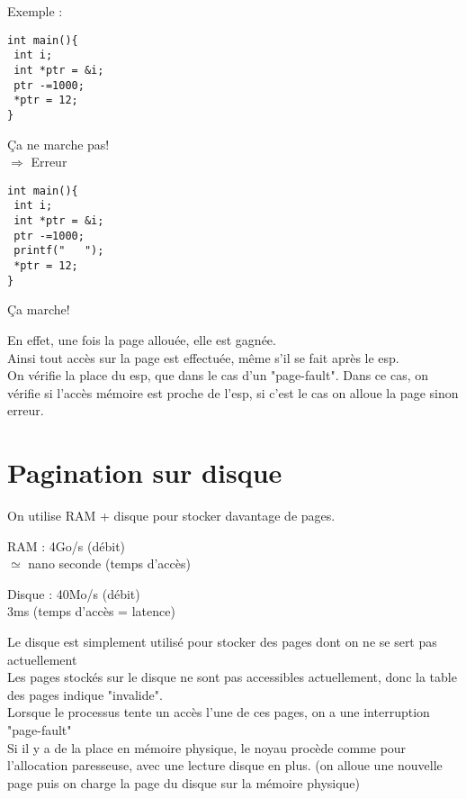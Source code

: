 \documentclass[12pt,a4paper]{report}
\begin{document}
Exemple : \\
\begin{minipage}{0.5\linewidth}
\begin{verbatim}
int main(){
 int i;
 int *ptr = &i;
 ptr -=1000;
 *ptr = 12;
}
\end{verbatim}
Ça ne marche pas!\\
$\Rightarrow$ Erreur
\end{minipage}
\begin{minipage}{0.5\linewidth}
\begin{verbatim}
int main(){
 int i;
 int *ptr = &i;
 ptr -=1000;
 printf("   ");
 *ptr = 12;
}
\end{verbatim}
Ça marche!
\end{minipage}

\bigskip
En effet, une fois la page allouée, elle est gagnée.\\
Ainsi tout accès sur la page est effectuée, même s'il se fait après le esp.\\ On vérifie la place du esp, que dans le cas d'un "page-fault". Dans ce cas, on vérifie si l’accès mémoire est proche de l'esp, si c'est le cas on alloue la page sinon erreur.\\

\chapter{Pagination sur disque}
On utilise RAM + disque pour stocker davantage de pages.\\

\begin{minipage}{0.5\linewidth}
RAM : 4Go/s (débit) \\
\hspace{2cm}$\simeq$ nano seconde (temps d'accès)\\
\end{minipage}
\begin{minipage}{0.5\linewidth}
Disque : 40Mo/s (débit) \\
\hspace{2cm} 3ms (temps d'accès = latence)\\
\end{minipage}

Le disque est simplement utilisé pour stocker des pages dont on ne se sert pas actuellement\\
Les pages stockés sur le disque ne sont pas accessibles actuellement, donc la table des pages indique "invalide".\\
Lorsque le processus tente un accès l'une de ces pages, on a une interruption  "page-fault" \\
Si il y a de la place en mémoire physique, le noyau procède comme pour l'allocation paresseuse, avec une lecture disque en plus. (on alloue une nouvelle page puis on charge la page du disque sur la mémoire physique)\\
\end{document}
